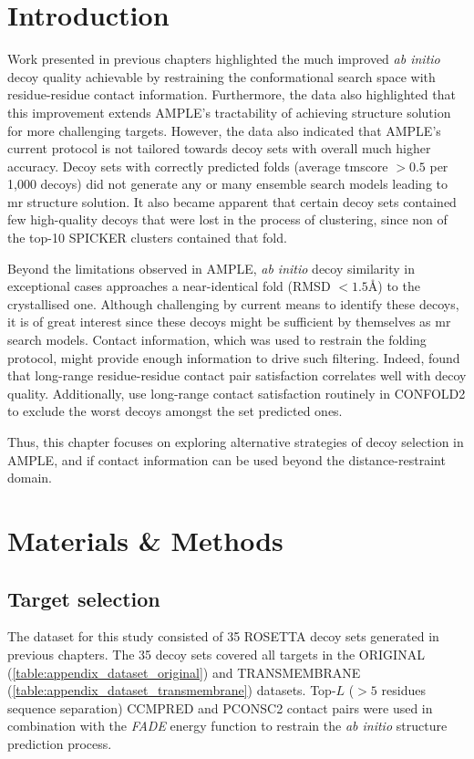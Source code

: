 \section{Introduction}
Work presented in previous chapters highlighted the much improved \textit{ab initio} decoy quality achievable by restraining the conformational search space with residue-residue contact information. Furthermore, the data also highlighted that this improvement extends AMPLE's tractability of achieving structure solution for more challenging targets. However, the data also indicated that AMPLE's current protocol is not tailored towards decoy sets with overall much higher accuracy. Decoy sets with correctly predicted folds (average \gls{tmscore} $>0.5$ per 1,000 decoys) did not generate any or many ensemble search models leading to \gls{mr} structure solution. It also became apparent that certain decoy sets contained few high-quality decoys that were lost in the process of clustering, since non of the top-10 SPICKER clusters contained that fold.

Beyond the limitations observed in AMPLE, \textit{ab initio} decoy similarity in exceptional cases approaches a near-identical fold (RMSD $<1.5$\AA) to the crystallised one. Although challenging by current means to identify these decoys, it is of great interest since these decoys might be sufficient by themselves as \gls{mr} search models. Contact information, which was used to restrain the folding protocol, might provide enough information to drive such filtering. Indeed, \textcite{De_Oliveira2017-gj} found that long-range residue-residue contact pair satisfaction correlates well with decoy quality. Additionally, \textcite{Adhikari2018-lj} use long-range contact satisfaction routinely in CONFOLD2 to exclude the worst decoys amongst the set predicted ones.

Thus, this chapter focuses on exploring alternative strategies of decoy selection in AMPLE, and if contact information can be used beyond the distance-restraint domain.

\section{Materials \& Methods}
\subsection{Target selection}
The dataset for this study consisted of 35 ROSETTA decoy sets generated in previous chapters. The 35 decoy sets covered all targets in the ORIGINAL (\cref{table:appendix_dataset_original}) and TRANSMEMBRANE (\cref{table:appendix_dataset_transmembrane}) datasets. Top-$L$ ($>5$ residues sequence separation) CCMPRED \cite{Seemayer2014-zp} and PCONSC2 \cite{Skwark2014-qp} contact pairs were used in combination with the \textit{FADE} energy function to restrain the \textit{ab initio} structure prediction process.

